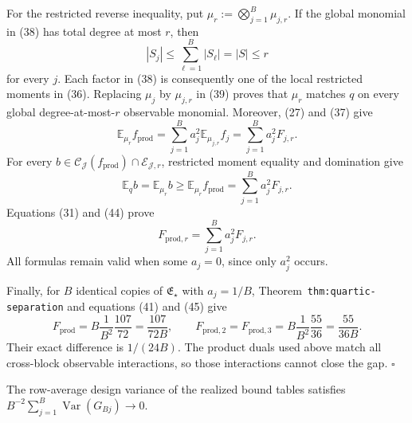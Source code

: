 For the restricted reverse inequality, put \(\mu_r:=\bigotimes_{j=1}^B\mu_{j,r}\).  If the global monomial in (38) has total degree at most \(r\), then
\[
|S_j|\le\sum_{\ell=1}^B|S_\ell|=|S|\le r
\tag{42}
\]
for every \(j\).  Each factor in (38) is consequently one of the local restricted moments in (36).  Replacing \(\mu_j\) by \(\mu_{j,r}\) in (39) proves that \(\mu_r\) matches \(q\) on every global degree-at-most-\(r\) observable monomial.  Moreover, (27) and (37) give
\[
\mathbb E_{\mu_r}f_{\mathrm{prod}}
=\sum_{j=1}^Ba_j^2\mathbb E_{\mu_{j,r}}f_j
=\sum_{j=1}^Ba_j^2F_{j,r}.
\tag{43}
\]
For every \(b\in\mathcal C_{\mathcal J}(f_{\mathrm{prod}})\cap\mathcal E_{\mathcal J,r}\), restricted moment equality and domination give
\[
\mathbb E_qb=\mathbb E_{\mu_r}b
\ge\mathbb E_{\mu_r}f_{\mathrm{prod}}
=\sum_{j=1}^Ba_j^2F_{j,r}.
\tag{44}
\]
Equations (31) and (44) prove
\[
F_{\mathrm{prod},r}=\sum_{j=1}^Ba_j^2F_{j,r}.
\tag{45}
\]
All formulas remain valid when some \(a_j=0\), since only \(a_j^2\) occurs.

Finally, for \(B\) identical copies of \(\mathfrak E_\star\) with \(a_j=1/B\), Theorem~\texttt{thm:quartic-separation} and equations (41) and (45) give
\[
F_{\mathrm{prod}}
=B\frac1{B^2}\frac{107}{72}
=\frac{107}{72B},
\qquad
F_{\mathrm{prod},2}=F_{\mathrm{prod},3}
=B\frac1{B^2}\frac{55}{36}
=\frac{55}{36B}.
\tag{46}
\]
Their exact difference is \(1/(24B)\).  The product duals used above match all cross-block observable interactions, so those interactions cannot close the gap. \(\square\)

The row-average design variance of the realized bound tables satisfies \(B^{-2}\sum_{j=1}^B\operatorname{Var}(G_{Bj})\longrightarrow0\).

